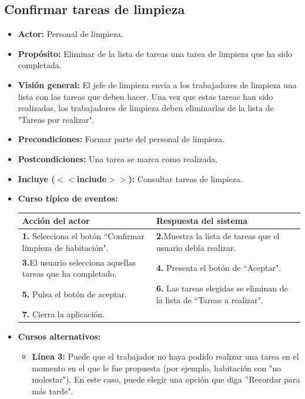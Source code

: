 \documentclass[spanish,a4paper,11pt, twoside]{report}	%
\begin{document}
		\subsection{Confirmar tareas de limpieza}
			\begin{itemize}
			\item \textbf{Actor:} Personal de limpieza.
			\item \textbf{Propósito: }Eliminar de la lista de tareas una tarea de limpieza que ha sido completada.
			\item \textbf{Visión general: }El jefe de limpieza envía a los trabajadores de limpieza una lista con las tareas que deben hacer. Una vez que estas tareas han sido realizadas, los trabajadores de limpieza deben eliminarlas de la lista de "Tareas por realizar".
			\item \textbf{Precondiciones:} Formar parte del personal de limpieza.
			\item \textbf{Postcondiciones:} Una tarea se marca como realizada.
			\item \textbf{Incluye ($<<$include$>>$):} Consultar tareas de limpieza.
			\item \textbf{Curso típico de eventos:}\\ 
				\begin{tabular}{|p{6cm}||p{6cm}|}
					\hline
					\textbf{Acción del actor} & \textbf{Respuesta del sistema} \\ \hline \hline
					\textbf{1.} Selecciona el botón  “Confirmar limpieza de habitación". & \textbf{2.}Muestra la lista de tareas que el usuario debía realizar.\\ \hline 
					\textbf{3.}El usuario selecciona aquellas tareas que ha completado. & \textbf{4.} Presenta el botón de “Aceptar".\\ \hline
					\textbf{5.} Pulsa el botón de aceptar. & \textbf{6.} Las tareas elegidas se eliminan de la lista de “Tareas a realizar". \\ \hline
					\textbf{7.} Cierra la aplicación.	& \\ \hline	
				\end{tabular}
			\item \textbf{Cursos alternativos:} 
				\begin{itemize}
					\item \textbf{Línea 3:} Puede que el trabajador no haya podido realizar una tarea en el momento en el que le fue propuesta (por ejemplo, habitación con "no molestar").
 En este caso, puede elegir una opción que diga ''Recordar para más tarde".
				\end{itemize}
		\end {itemize}
\end{document}
